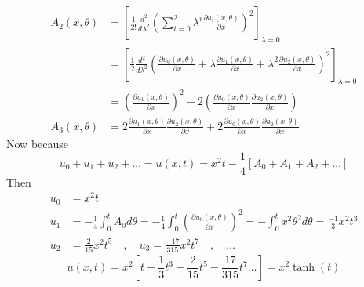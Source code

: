 \documentclass[]{article}
\begin{document}
\begin{example}
\begin{align*}
        \\
        A_2(x,\theta) & =\left[\frac{1}{2!} \frac{d^2}{d \lambda^2} \left(\sum_{i=0}^{2}  \lambda^i \frac{\partial u_i(x,\theta)}{\partial x}\right)^2\right]_{\lambda = 0}
        \\
                      & = \left[\frac{1}{2} \frac{d^2}{d \lambda^2} \left(\frac{\partial u_0(x,\theta)}{\partial x} + \lambda \frac{\partial u_1(x,\theta)}{\partial x} + \lambda^2 \frac{\partial u_2(x,\theta)}{\partial x}\right)^2\right]_{\lambda = 0}
        \\
                      & = \left(\frac{\partial u_1(x,\theta)}{\partial x}\right)^2 + 2 \left(\frac{\partial u_0(x,\theta)}{\partial x}\frac{\partial u_2(x,\theta)}{\partial x}\right)
        \\
        A_3(x,\theta) & = 2\frac{\partial u_1(x,\theta)}{\partial x}\frac{\partial u_2(x,\theta)}{\partial x} + 2\frac{\partial u_0(x,\theta)}{\partial x} \frac{\partial u_2(x,\theta)}{\partial x}
    \end{align*}
    Now because
    \[
        u_0 + u_1 + u_2 +\dots = u(x,t) = x^2t - \frac{1}{4}[A_0+A_1+A_2+\dots]
    \]
    Then
    \begin{align*}
        u_0 & = x^2t
        \\
        u_1 & = -\frac{1}{4}\int_{0}^{t}A_0d\theta = -\frac{1}{4}\int_{0}^{t}\left(\frac{\partial u_0(x,\theta)}{\partial x}\right)^2 = -\int_{0}^{t} x^2 \theta^2 d\theta = \frac{-1}{3}x^2t^3
        \\
        u_2 & = \frac{2}{15} x^2t^5
        \quad , \quad
        u_3 = \frac{-17}{315} x^2t^7 \quad , \quad \dots
    \end{align*}
    \[
        u(x,t) = x^2 \left[t-\frac{1}{3}t^3 + \frac{2}{15} t^5 - \frac{17}{315} t^7 \dots\right] = x^2 \tanh(t)
    \]
\end{example}
\end{document}
